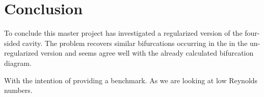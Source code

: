 
\section{Conclusion} \label{concl}

To conclude this master project has investigated a regularized version of the
four-sided cavity. The problem recovers similar bifurcations occurring in the
in the un-regularized version and seems agree well with the already calculated
bifurcation diagram.


With the intention of providing a benchmark. As we are looking at low Reynolds
numbers. 



